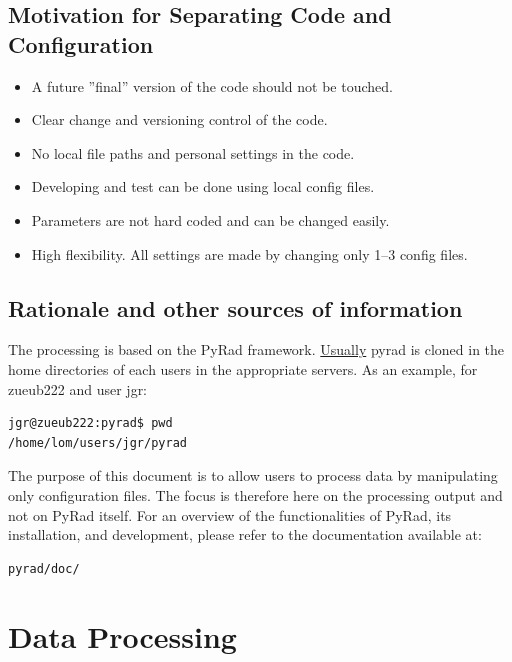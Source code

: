 \documentclass[a4paper,11pt,pdftex,twoside]{scrartcl}
\begin{document}
\subsection{Motivation for Separating Code and Configuration}
\begin{itemize}
  \item A future ''final'' version of the code should not be touched.
  \item Clear change and versioning control of the code.
  \item No local file paths and personal settings in the code.
  \item Developing and test can be done using local config files.
  \item Parameters are not hard coded and can be changed easily.
  \item High flexibility. All settings are made by changing only 1--3
    config files.
\end{itemize}

\subsection{Rationale and other sources of information}
The processing is based on the PyRad framework. \underline{Usually} pyrad is cloned in the home directories of each users in the appropriate servers. As an example, for zueub222 and user jgr:

\begin{verbatim}
jgr@zueub222:pyrad$ pwd
/home/lom/users/jgr/pyrad
\end{verbatim} 

The purpose of this document is to allow users to process data by manipulating only configuration files. The focus is therefore here on the processing output and not on PyRad itself. For an overview of the functionalities of PyRad, its installation, and development, please refer to the documentation available at:

\begin{verbatim}
pyrad/doc/
\end{verbatim}



\newpage
\section{Data Processing}
\end{document}

